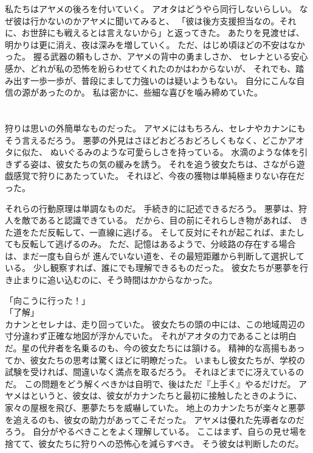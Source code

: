 \documentclass[../IHMain]{subfiles}
\begin{document}
私たちはアヤメの後ろを付いていく。
アオタはどうやら同行しないらしい。
なぜ彼は行かないのかアヤメに聞いてみると、
「彼は後方支援担当なの。それに、お世辞にも戦えるとは言えないから」と返ってきた。
あたりを見渡せば、明かりは更に消え、夜は深みを増していく。
ただ、はじめ頃ほどの不安はなかった。
握る武器の頼もしさか、アヤメの背中の勇ましさか、
セレナといる安心感か、どれが私の恐怖を紛らわせてくれたのかはわからないが、
それでも、踏み出す一歩一歩が、普段にまして力強いのは疑いようもない。
自分にこんな自信の源があったのか。
私は密かに、些細な喜びを噛み締めていた。

\section{}
狩りは思いの外簡単なものだった。
アヤメにはもちろん、セレナやカナンにもそう言えるだろう。
悪夢の外見はさほどおどろおどろしくもなく、どこかアオタに似た、
ぬいぐるみのような可愛らしさを持っている。
水滴のような体を引きずる姿は、彼女たちの気の緩みを誘う。
それを追う彼女たちは、さながら遊戯感覚で狩りにあたっていた。
それほど、今夜の獲物は単純極まりない存在だった。

それらの行動原理は単調なものだ。
手続き的に記述できるだろう。
悪夢は、狩人を敵であると認識できている。
だから、目の前にそれらしき物があれば、
きた道をただ反転して、一直線に逃げる。
そして反対にそれが起これば、またしても反転して逃げるのみ。
ただ、記憶はあるようで、分岐路の存在する場合は、まだ一度も自らが
進んでいない道を、その最短距離から判断して選択している。
少し観察すれば、誰にでも理解できるものだった。
彼女たちが悪夢を行き止まりに追い込むのに、そう時間はかからなかった。

「向こうに行った！」\\
「了解」\\
カナンとセレナは、走り回っていた。
彼女たちの頭の中には、この地域周辺の寸分違わず正確な地図が浮かんでいた。
それがアオタの力であることは明白だ。星の代弁者を名乗るのも、今の彼女たちには頷ける。
精神的な高揚もあってか、彼女たちの思考は驚くほどに明瞭だった。
いまもし彼女たちが、学校の試験を受ければ、間違いなく満点を取るだろう。
それほどまでに冴えているのだ。
この問題をどう解くべきかは自明で、後はただ『上手く』やるだけだ。
アヤメはというと、彼女は、彼女がカナンたちと最初に接触したときのように、
家々の屋根を飛び、悪夢たちを威嚇していた。
地上のカナンたちが楽々と悪夢を追えるのも、彼女の助力があってこそだった。
アヤメは優れた先導者なのだろう。
自分がやるべきことをよく理解している。
ここはまず、自らの見せ場を捨てて、彼女たちに狩りへの恐怖心を減らすべき。
そう彼女は判断したのだ。
\end{document}
